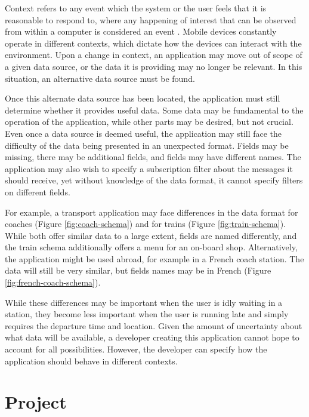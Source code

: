 \documentclass[12pt,twoside,notitlepage]{report}
\begin{document}
Context refers to any event which the system or the user feels that it is reasonable to respond to, where any happening of interest that can be observed from within a computer is considered an event \cite[page 11]{muhl2006distributed}. 
Mobile devices constantly operate in different contexts, which dictate how the devices can interact with the environment. 
Upon a change in context, an application may move out of scope of a given data source, or the data it is providing may no longer be relevant. 
In this situation, an alternative data source must be found.

Once this alternate data source has been located, the application must still determine whether it provides useful data. 
Some data may be fundamental to the operation of the application, while other parts may be desired, but not crucial.  
Even once a data source is deemed useful, the application may still face the difficulty of the data being presented in an unexpected format. 
Fields may be missing, there may be additional fields, and fields may have different names. 
The application may also wish to specify a subscription filter about the messages it should receive, yet without knowledge of the data format, it cannot specify filters on different fields.

For example, a transport application may face differences in the data format for coaches (Figure \ref{fig:coach-schema}) and for trains (Figure \ref{fig:train-schema}). 
While both offer similar data to a large extent, fields are named differently, and the train schema additionally offers a menu for an on-board shop.
Alternatively, the application might be used abroad, for example in a French coach station. The data will still be very similar, but fields names may be in French (Figure \ref{fig:french-coach-schema}).

While these differences may be important when the user is idly waiting in a station, they become less important when the user is running late and simply requires the departure time and location.
Given the amount of uncertainty about what data will be available, a developer creating this application cannot hope to account for all possibilities. 
However, the developer can specify how the application should behave in different contexts.

\section{Project}
\end{document}
